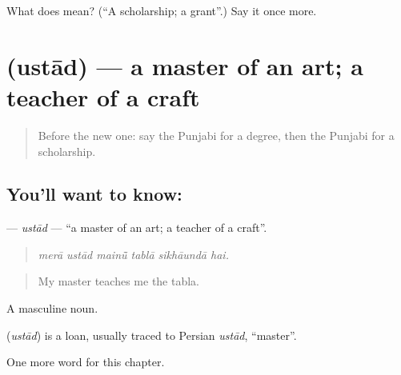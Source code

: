 \begin{tcolorbox}[breakable,colback=teal!4,colframe=teal!35!black,title={Before you move on}]
What does  mean? (\textquotedblleft{}A scholarship; a grant\textquotedblright{}.) Say it once more.
\end{tcolorbox}
\section[\texorpdfstring{\pa{ਉਸਤਾਦ} (ustād)}{ਉਸਤਾਦ (ustād)}]{ (ustād) — a master of an art; a teacher of a craft}

\label{lesson:PA-C361-ustad}



\begin{quote}
Before the new one: say the Punjabi for a degree, then the Punjabi for a scholarship.
\end{quote}

\subsection*{You'll want to know: }
\textbf{} — \emph{ustād} — \textquotedblleft{}a master of an art; a teacher of a craft\textquotedblright{}.

\begin{quote}
     
\end{quote}

\begin{quote}
\emph{merā ustād mainū̃ tablā sikhāundā hai.}
\end{quote}

\begin{quote}
My master teaches me the tabla.
\end{quote}

A masculine noun.

\begin{cousinweb}
\textbf{} (\emph{ustād}) is a loan, usually traced to Persian \emph{ustād}, \textquotedblleft{}master\textquotedblright{}.
\end{cousinweb}

\begin{grammarlens}[title={What you've built}]
One more word for this chapter.
\end{grammarlens}

